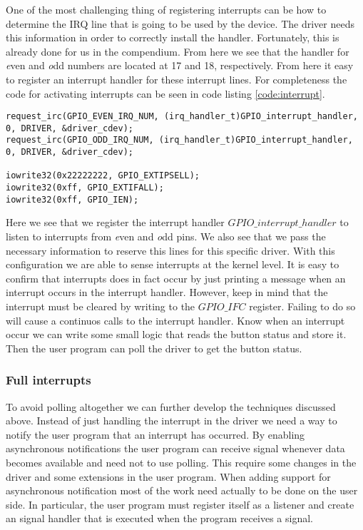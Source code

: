 One of the most challenging thing of registering interrupts can be how to determine the IRQ line that is going to be used by the device. The driver needs this information in order to correctly install the handler. Fortunately, this is already done for us in the compendium. From here we see that the handler for {\emph even} and {\emph odd} numbers are located at 17 and 18, respectively. From here it easy to register an interrupt handler for these interrupt lines. For completeness the code for activating interrupts can be seen in code listing \ref{code:interrupt}.

\begin{lstlisting}[caption=Activate interupts, label=code:interrupt]
request_irc(GPIO_EVEN_IRQ_NUM, (irq_handler_t)GPIO_interrupt_handler, 0, DRIVER, &driver_cdev);
request_irc(GPIO_ODD_IRQ_NUM, (irq_handler_t)GPIO_interrupt_handler, 0, DRIVER, &driver_cdev);

iowrite32(0x22222222, GPIO_EXTIPSELL);
iowrite32(0xff, GPIO_EXTIFALL);
iowrite32(0xff, GPIO_IEN);
\end{lstlisting}



Here we see that we register the interrupt handler $GPIO\_interrupt\_handler$ to listen to interrupts from {\emph even} and {\emph odd} pins. We also see that we pass the necessary information to reserve this lines for this specific driver. With this configuration we are able to sense interrupts at the kernel level. It is easy to confirm that interrupts does in fact occur by just printing a message when an interrupt occurs in the interrupt handler. However, keep in mind that the interrupt must be cleared by writing to the $GPIO\_IFC$ register. Failing to do so will cause a continuos calls to the interrupt handler. Know when an interrupt occur we can write some small logic that reads the button status and store it. Then the user program can poll the driver to get the button status. 


\subsubsection{Full interrupts}
To avoid polling altogether we can further develop the techniques discussed above. Instead of just handling the interrupt in the driver we need a way to notify the user program that an interrupt has occurred. By enabling asynchronous notifications the user program can receive signal whenever data becomes available and need not to use polling. This require some changes in the driver and some extensions in the user program. When adding support for asynchronous notification most of the work need actually to be done on the user side. In particular, the user program must register itself as a listener and create an signal handler that is executed when the program receives a signal. 

